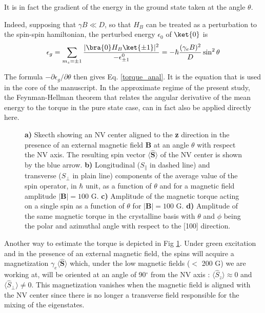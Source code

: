 \documentclass[preprintnumbers,amsmath,amssymb,onecolumn,12pt]{revtex4}
\begin{document}
It is in fact the gradient of the energy in the ground state taken at the angle $\theta$. 

Indeed, supposing that $\gamma B \ll D$, so that $H_{B}$ can be treated as a perturbation to the spin-spin hamiltonian, 
the perturbed energy $\epsilon_0$ of $\ket{0}$ is 
$$ \epsilon_g=\sum_{m_s=\pm 1}\frac{ |\bra{0} H_B \ket{\pm 1}|^2}{-\epsilon^0_{\pm 1}}=-\hbar\frac{(\gamma_e B)^2 }{D} \sin^2\theta
$$

The formula $ -\partial \epsilon_g /\partial \theta$ then gives Eq. \ref{torque_anal}. It is the equation that is used in the core of the manuscript. 
In the approximate regime of the present study, the Feynman-Hellman theorem that relates the angular derivative of the mean energy to the torque in the pure state case, 
can in fact also be applied directly here.

\begin{figure}[ht]
  \caption{\textbf{a)} Skecth showing an NV center aligned to the \textbf{z} direction in the presence of an external magnetic field \textbf{B} at an angle $\theta$ with respect the NV axis. The resulting spin vector $\langle \mathbf{ \hat S} \rangle$ of the NV center is shown by the blue arrow.
   \textbf{b)} Longitudinal ($S_\parallel$ in dashed line) and transverse ($S_\perp$ in plain line) components of the average value of the spin operator, in $\hbar$ unit, as a function of $\theta$ and for a magnetic field amplitude $|\mathbf{B}|=100$ G.   
   \textbf{c)} Amplitude of the magnetic torque acting on a single spin as a function of $\theta$ for $|\mathbf{B}|=100$ G.
   \textbf{d)} Amplitude of the same magnetic torque in the crystalline basis with $\theta$ and $\phi$ being the polar and azimuthal angle with respect to the [100] direction.}
  		\label{Torque1classe}
\end{figure}

Another way to estimate the torque is depicted in Fig \ref{Torque1classe}. Under green excitation and in the presence of an external magnetic field, the spins will acquire a magnetization $\gamma_e \langle\hat{\mathbf S}\rangle$ which, under the low magnetic fields ($<$ 200 G) we are working at, will be oriented at an angle of 90$^\circ$ from the NV axis : $\langle \hat S_z \rangle \approx 0$ and $\langle \hat S_\perp \rangle \neq 0$. This magnetization vanishes when the magnetic field is aligned with the NV center since there is no longer a transverse field responsible for the mixing of the eigenstates. 
\end{document}
